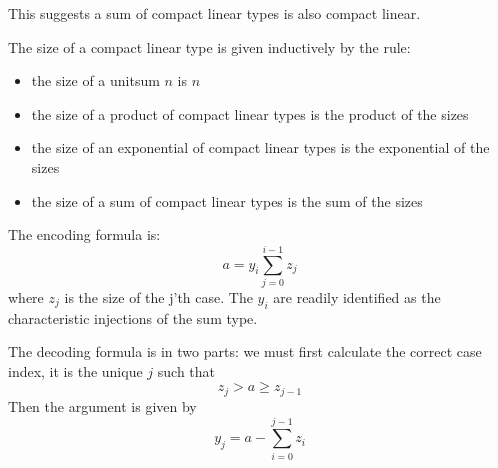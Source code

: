 \documentclass{article}
\begin{document}
This suggests a sum of compact linear types is also compact linear.

The size of a compact linear type is given inductively by
the rule:

\begin{itemize}
\item the size of a unitsum $n$ is $n$
\item the size of a product of compact linear types is the product
of the sizes
\item the size of an exponential of compact linear types is
the exponential of the sizes
\item the size of a sum of compact linear types is the
sum of the sizes
\end{itemize}

The encoding formula is:
$$a = y_i \sum^{i-1}_{j=0} z_j$$
where $z_j$ is the size of the j'th case. The $y_i$ are readily
identified as the characteristic injections of the sum type.

The decoding formula is in two parts: we must first calculate
the correct case index, it is the unique $j$ such that 
$$z_{j} > a \ge z_{j-1}$$
Then the argument is given by
$$y_j = a - \sum_{i=0}^{j-1}z_i$$
\end{document}
